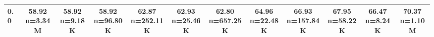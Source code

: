 \begin{table}
\begin{tabular}{lccccccccccc}
0.0 & \makecell{58.92 \\ \scriptsize n=3.34M} & \makecell{58.92 \\ \scriptsize n=9.18K} & \makecell{58.92 \\ \scriptsize n=96.80K} & \makecell{62.87 \\ \scriptsize n=252.11K} & \makecell{62.93 \\ \scriptsize n=25.46K} & \makecell{62.80 \\ \scriptsize n=657.25K} & \makecell{64.96 \\ \scriptsize n=22.48K} & \makecell{66.93 \\ \scriptsize n=157.84K} & \makecell{67.95 \\ \scriptsize n=58.22K} & \makecell{66.47 \\ \scriptsize n=8.24K} & \makecell{70.37 \\ \scriptsize n=1.10M} \\
            \bottomrule
            \end{tabular}
            \label{tab:si-disruption-matrix-3}
            \end{table}